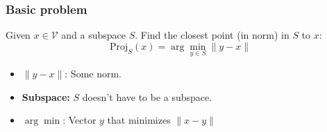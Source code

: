     \subsubsection{Basic problem}
        \begin{intuition}
            Given $x\in \mathcal{V}$ and a subspace $S$. Find the closest point (in norm) in $S$ to $x$: 
            \begin{equation}
                \text{Proj}_S(x) = \arg\min_{y \in S} \| y - x \|
            \end{equation}
            \begin{itemize}
                \item $\| y - x \|$: Some norm.
                \item \textbf{Subspace:} $S$ doesn't have to be a subspace. 
                \item $\arg\min$: Vector $y$ that minimizes $\lVert x - y\rVert$
            \end{itemize}
        \end{intuition}
        
